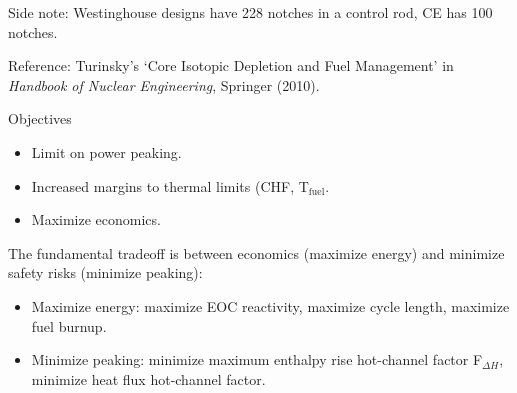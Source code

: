 \documentclass{school-22.211-notes}
\begin{document}
Side note: Westinghouse designs have 228 notches in a control rod, CE has 100 notches. 


\clearpage
{} 





















Reference: Turinsky's `Core Isotopic Depletion and Fuel Management' in \textit{Handbook of Nuclear Engineering}, Springer (2010). 


Objectives
\begin{itemize}
\item Limit on power peaking. 
\item Increased margins to thermal limits (CHF, T$_{\mathrm{fuel}}$. 
\item Maximize economics. 
\end{itemize}
The fundamental tradeoff is between economics (maximize energy) and minimize safety risks (minimize peaking):
\begin{itemize}
\item Maximize energy: maximize EOC reactivity, maximize cycle length, maximize fuel burnup. 
\item Minimize peaking: minimize maximum enthalpy rise hot-channel factor F$_{\Delta H}$, minimize heat flux hot-channel factor. 
\end{itemize}
\end{document}
